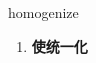 
\begin{frame}
{\huge homogenize}
\begin{center}
\begin{enumerate}\Large
  \item \textbf{使统一化}
\end{enumerate}
\end{center}
\end{frame}
